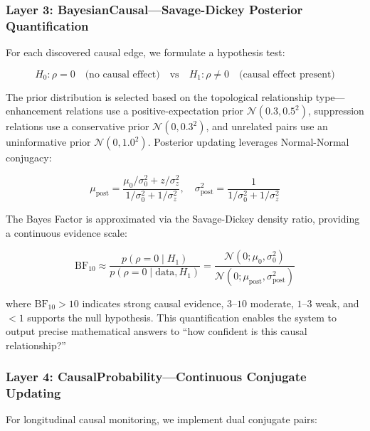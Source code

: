 \documentclass[11pt,a4paper]{article}
\begin{document}
\subsubsection{Layer 3: BayesianCausal---Savage-Dickey Posterior Quantification}

For each discovered causal edge, we formulate a hypothesis test:

\begin{equation}
H_0: \rho = 0 \quad \text{(no causal effect)} \quad \text{vs} \quad H_1: \rho \neq 0 \quad \text{(causal effect present)}
\label{eq:hypothesis}
\end{equation}

The prior distribution is selected based on the topological relationship type---enhancement relations use a positive-expectation prior \(\mathcal{N}(0.3, 0.5^2)\), suppression relations use a conservative prior \(\mathcal{N}(0, 0.3^2)\), and unrelated pairs use an uninformative prior \(\mathcal{N}(0, 1.0^2)\). Posterior updating leverages Normal-Normal conjugacy:

\begin{equation}
\mu_{\text{post}} = \frac{\mu_0/\sigma_0^2 + z/\sigma_z^2}{1/\sigma_0^2 + 1/\sigma_z^2}, \quad \sigma^2_{\text{post}} = \frac{1}{1/\sigma_0^2 + 1/\sigma_z^2}
\label{eq:conjugate}
\end{equation}

The Bayes Factor is approximated via the Savage-Dickey density ratio, providing a continuous evidence scale:

\begin{equation}
\text{BF}_{10} \approx \frac{p(\rho = 0 \mid H_1)}{p(\rho = 0 \mid \text{data}, H_1)} = \frac{\mathcal{N}(0; \mu_0, \sigma_0^2)}{\mathcal{N}(0; \mu_{\text{post}}, \sigma^2_{\text{post}})}
\label{eq:savage_dickey}
\end{equation}

where \(\text{BF}_{10} > 10\) indicates strong causal evidence, \(3\)--\(10\) moderate, \(1\)--\(3\) weak, and \(<1\) supports the null hypothesis. This quantification enables the system to output precise mathematical answers to ``how confident is this causal relationship?''

\subsubsection{Layer 4: CausalProbability---Continuous Conjugate Updating}

For longitudinal causal monitoring, we implement dual conjugate pairs:
\end{document}
